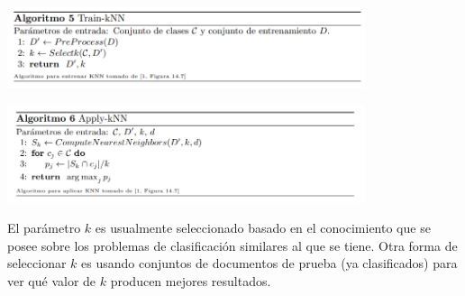 \documentclass[t,compress,10pt,xcolor=dvipsnames]{beamer}
\begin{document}
{		\framebreak
			
			
			\includegraphics[width=10.5cm]{TrainkNN.png}
			
		\framebreak
			
			
			\includegraphics[width=10.5cm]{ApplykNN.png}
			
		\framebreak
			
			El par\'ametro $k$ es usualmente seleccionado basado en el conocimiento que se posee sobre los problemas de clasificaci\'on similares al que se tiene. Otra forma de seleccionar $k$ es usando conjuntos de documentos de prueba (ya clasificados) para ver qu\'e valor de $k$ producen mejores resultados.
			
%						
%			
	}
	
\end{document}
